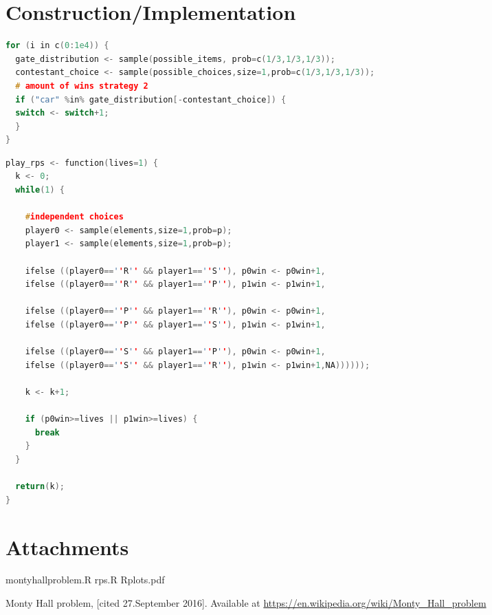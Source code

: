 \documentclass[a4paper, 11pt]{article}
\begin{document}
\newpage
\section*{Construction/Implementation}
\begin{lstlisting}[caption={Simulation of "swtich" strategy in Monty Hall problem},label={lst:keepmonty},language=C++]
for (i in c(0:1e4)) {
  gate_distribution <- sample(possible_items, prob=c(1/3,1/3,1/3));
  contestant_choice <- sample(possible_choices,size=1,prob=c(1/3,1/3,1/3));
  # amount of wins strategy 2
  if ("car" %in% gate_distribution[-contestant_choice]) {
  switch <- switch+1;
  }
}
\end{lstlisting}

\begin{lstlisting}[caption={Number of trials needed to finish the game given k lives},label={lst:ntrials},language=C++]
play_rps <- function(lives=1) {
  k <- 0;
  while(1) {

    #independent choices
    player0 <- sample(elements,size=1,prob=p);
    player1 <- sample(elements,size=1,prob=p);

    ifelse ((player0==''R'' && player1==''S''), p0win <- p0win+1,
    ifelse ((player0==''R'' && player1==''P''), p1win <- p1win+1,

    ifelse ((player0==''P'' && player1==''R''), p0win <- p0win+1,
    ifelse ((player0==''P'' && player1==''S''), p1win <- p1win+1,

    ifelse ((player0==''S'' && player1==''P''), p0win <- p0win+1,
    ifelse ((player0==''S'' && player1==''R''), p1win <- p1win+1,NA))))));

    k <- k+1;

    if (p0win>=lives || p1win>=lives) {
      break
    }
  }

  return(k);
}
\end{lstlisting}

\section*{Attachments}

montyhallproblem.R rps.R Rplots.pdf

\begin{thebibliography}{9}
  
  Monty Hall problem, [cited 27.September 2016]. Available at \url{https://en.wikipedia.org/wiki/Monty_Hall_problem}

\end{thebibliography}
\end{document}

